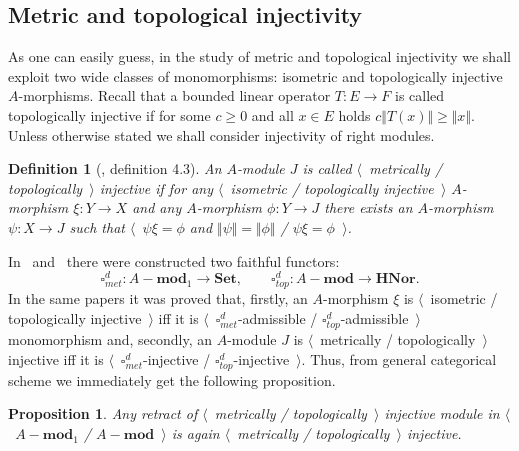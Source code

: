 \documentclass[12pt]{article}
\newtheorem{proposition}[theorem]{Proposition}
\newtheorem{definition}[theorem]{Definition}
\begin{document}

\subsection{Metric and topological
    injectivity}\label{SubSectionMetricAndTopologicalInjectivity}

As one can easily guess, in the study of metric and topological injectivity we
shall exploit two wide classes of monomorphisms: isometric and topologically
injective $A$-morphisms. Recall that a bounded linear operator $T:E\to F$ is
called topologically injective if for some $c\geq 0$ and all $x\in E$ holds
$c\Vert T(x)\Vert\geq \Vert x\Vert$. Unless otherwise stated we shall consider
injectivity of right modules.

\begin{definition}[\cite{HelMetrFrQMod}, definition 4.3]\label{MetTopInjMod} An
    $A$-module $J$ is called $\langle$~metrically / topologically~$\rangle$
    injective if for any $\langle$~isometric / topologically injective~$\rangle$
    $A$-morphism $\xi:Y\to X$ and any $A$-morphism $\phi:Y\to J$ there exists an
    $A$-morphism $\psi:X\to J$ such that $\langle$~$\psi\xi=\phi$  and
    $\Vert\psi\Vert=\Vert\phi\Vert$ / $\psi\xi=\phi$~$\rangle$.
\end{definition}

In~\cite{HelMetrFrQMod} and~\cite{ShtTopFrClassicQuantMod} there were
constructed two faithful functors:
$$
    \square_{met}^d:A-\mathbf{mod}_1\to\mathbf{Set},
    \qquad
    \square_{top}^d:A-\mathbf{mod}\to\mathbf{HNor}.
$$
In the same papers it was proved that, firstly, an $A$-morphism $\xi$ is
$\langle$~isometric / topologically injective~$\rangle$ iff it is
$\langle$~$\square_{met}^d$-admissible / $\square_{top}^d$-admissible~$\rangle$
monomorphism and, secondly, an $A$-module $J$ is $\langle$~metrically /
topologically~$\rangle$ injective iff it is
$\langle$~$\square_{met}^d$-injective / $\square_{top}^d$-injective~$\rangle$.
Thus, from general categorical scheme we immediately get the following
proposition.

\begin{proposition}\label{RetrMetTopInjIsMetTopInj} Any retract of
    $\langle$~metrically / topologically~$\rangle$ injective module in
    $\langle$~$A-\mathbf{mod}_1$ / $A-\mathbf{mod}$~$\rangle$ is again $\langle$~metrically /
    topologically~$\rangle$ injective.
\end{proposition}
\end{document}
